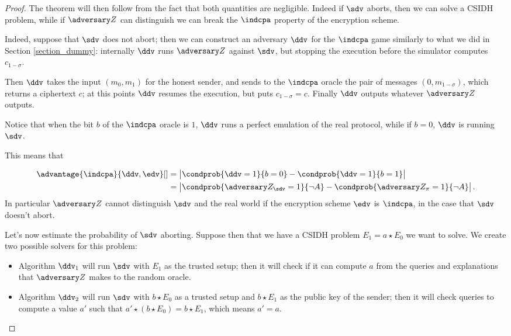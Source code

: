 \begin{proof}
    The theorem will then follow from the fact that both quantities are negligible. Indeed if $\sdv$ aborts, then we can solve a CSIDH problem, while if $\zdv$ can distinguish we can break the $\indcpa$ property of the encryption scheme.
    
    Indeed, suppose that $\sdv$ does not abort; then we can construct an adversary $\ddv$ for the $\indcpa$ game similarly to what we did in Section \ref{section_dummy}: internally $\ddv$ runs $\zdv$ against $\sdv$, but stopping the execution before the simulator computes $c_{1-\sigma}$.
    
    Then $\ddv$ takes the input $(m_0,m_1)$ for the honest sender, and sends to the $\indcpa$ oracle the pair of messages $(0,m_{1-\sigma})$, which returns a ciphertext $c$; at this points $\ddv$ resumes the execution, but puts $c_{1-\sigma}=c$. Finally $\ddv$ outputs whatever $\zdv$ outputs.
    
    Notice that when the bit $b$ of the $\indcpa$ oracle is $1$, $\ddv$ runs a perfect emulation of the real protocol, while if $b=0$, $\ddv$ is running $\sdv$.
    
    This means that
    
    \begin{align*}
    \advantage{\indcpa}{\ddv,\edv}[] &= \left| \condprob{\ddv=1}{b=0} -  \condprob{\ddv=1}{b=1}\right|\\
    & = \left| \condprob{\zdv_\sdv=1}{\neg A} - \condprob{\zdv_\pi=1}{\neg A} \right|.
    \end{align*}
    In particular $\zdv$ cannot distinguish $\sdv$ and the real world if the encryption scheme $\edv$ is $\indcpa$, in the case that $\sdv$ doesn't abort.    
    
    Let's now estimate the probability of $\sdv$ aborting. Suppose then that we have a CSIDH problem $E_1=a\star E_0$ we want to solve. We create two possible solvers for this problem:
    \begin{itemize}
        \item Algorithm $\ddv_1$ will run $\sdv$ with $E_1$ as the trusted setup; then it will check if it can compute $a$ from the queries and explanations that $\zdv$ makes to the random oracle.
        \item Algorithm $\ddv_2$ will run $\sdv$ with $b\star E_0$ as a trusted setup and $b\star E_1$ as the public key of the sender; then it will check queries to compute a value $a'$ such that $a'\star(b\star E_0)=b\star E_1$, which means $a'=a$.
    \end{itemize}
    

\end{proof}
